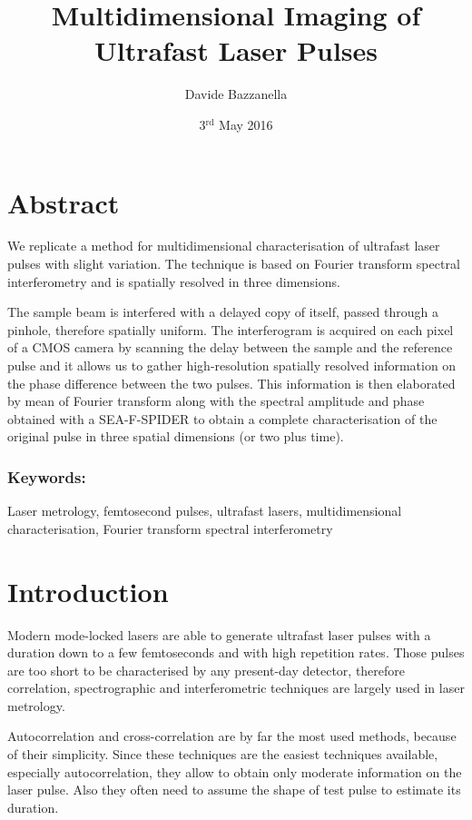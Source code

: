 \documentclass[12pt,a4paper,twoside]{article}
\author{Davide Bazzanella}
\title{Multidimensional Imaging of Ultrafast Laser Pulses}
\date{3$^{\mathrm{rd}}$ May 2016}
\begin{document}

\cleardoublepage
\section*{Abstract}
We replicate a method for multidimensional characterisation of ultrafast laser pulses\cite{miranda} with slight variation.
The technique is based on Fourier transform spectral interferometry and is spatially resolved in three dimensions.

The sample beam is interfered with a delayed copy of itself, passed through a pinhole, therefore spatially uniform.
The interferogram is acquired on each pixel of a CMOS camera by scanning the delay between the sample and the reference pulse and it allows us to gather high-resolution spatially resolved information on the phase difference between the two pulses.
This information is then elaborated by mean of Fourier transform along with the spectral amplitude and phase obtained with a SEA-F-SPIDER to obtain a complete characterisation of the original pulse in three spatial dimensions (or two plus time).
\subsubsection*{Keywords:} Laser metrology, femtosecond pulses, ultrafast lasers, multidimensional characterisation, Fourier transform spectral interferometry
\cleardoublepage
\tableofcontents

\cleardoublepage
{}
\section{Introduction}
Modern mode-locked lasers are able to generate ultrafast laser pulses with a duration down to a few femtoseconds \cite{tamura93,schriever14,yu30} and with high repetition rates.
Those pulses are too short to be characterised by any present-day detector, therefore correlation, spectrographic and interferometric techniques are largely used in laser metrology.

Autocorrelation and cross-correlation are by far the most used methods, because of their simplicity.
Since these techniques are the easiest techniques available, especially autocorrelation, they allow to obtain only moderate information on the laser pulse.
Also they often need to assume the shape of test pulse to estimate its duration.
\end{document}

